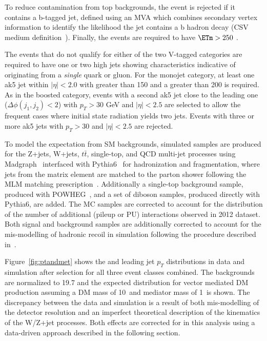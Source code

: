To reduce contamination from top backgrounds, the event is rejected if it contains a 
b-tagged jet, defined using an MVA which combines secondary vertex
information to identify the likelihood the jet contains a b hadron
decay (CSV medium definition~\cite{BTAG}). Finally, the events are required to 
have $\ETm>250$ \gev. 

The events that do not qualify for either of the two V-tagged
categories are required to have one or two high \pt jets showing characteristics indicative of originating from a \emph{single} quark or gluon. 
For the monojet category, at least one ak5 jet within $|\eta|<2.0$ with \pt greater 
than 150 \gev and a \ETm greater than 200 \gev is required.  
As in the boosted category, events with a second ak5 jet close to the leading one ($\Delta\phi(j_1,j_2) < 2$) 
with $p_T>30$ GeV and $|\eta|<2.5$ are selected to allow the frequent cases where initial state radiation yields two jets.
Events with three or more ak5 jets with $p_T>30$ \gev and $|\eta|<2.5$ are rejected.

To model the expectation from SM backgrounds, simulated samples are produced for the
Z+jets, W+jets, $t\bar{t}$, single-top, and QCD multi-jet processes
using Madgraph~\cite{amcatnlo} interfaced with Pythia6~\cite{Sjostrand:2006za} for hadronization and
fragmentation, where jets from the matrix element are matched to the parton shower following the MLM matching prescription~\cite{Mangano:2006rw}.
Additionally a single-top background sample, produced with
POWHEG~\cite{powheg}, and a set of diboson samples, produced directly
with Pythia6, are added. 
The MC samples are corrected to account for the distribution of the number of additional (pileup or PU) interactions
observed in 2012 dataset. Both signal and background samples are additionally corrected to account for the mis-modelling of hadronic recoil in simulation following
the procedure described in~\cite{CMS-PAS-JME-12-002}.


Figure~\ref{fig:ptandmet} shows the \ETm and leading jet $p_{T}$ distributions in data and 
simulation after selection for all three event classes combined. The backgrounds are normalized to 19.7\fbinv 
and the expected distribution for vector mediated DM production assuming a DM mass of 10~\GeV and mediator mass of 1~\TeV is shown. 
The discrepancy between the data and simulation is a result of both mis-modelling of the 
detector resolution and an imperfect theoretical description of the kinematics of the W/Z+jet processes. 
Both effects are corrected for in this analysis using a data-driven approach described in the following section. 

